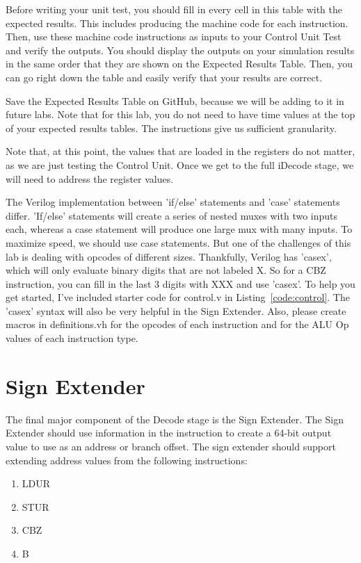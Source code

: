 Before writing your unit test, you should fill in every cell in this table with the expected results.  This includes producing the machine code for each instruction.  Then, use these machine code instructions as inputs to your Control Unit Test and verify the outputs.  You should display the outputs on your simulation results in the same order that they are shown on the Expected Results Table.  Then, you can go right down the table and easily verify that your results are correct.  

Save the Expected Results Table on GitHub, because we will be adding to it in future labs.  Note that for this lab, you do not need to have time values at the top of your expected results tables.  The instructions give us sufficient granularity.

Note that, at this point, the values that are loaded in the registers do not matter, as we are just testing the Control Unit.  Once we get to the full iDecode stage, we will need to address the register values.

The Verilog implementation between 'if/else' statements and 'case' statements differ.  'If/else' statements will create a series of nested muxes with two inputs each, whereas a case statement will produce one large mux with many inputs.  To maximize speed, we should use case statements.  But one of the challenges of this lab is dealing with opcodes of different sizes.  Thankfully, Verilog has 'casex', which will only evaluate binary digits that are not labeled X.  So for a CBZ instruction, you can fill in the last 3 digits with XXX and use 'casex'.  To help you get started, I've included starter code for control.v in  Listing~\ref{code:control}.  The 'casex' syntax will also be very helpful in the Sign Extender.  Also, please create macros in definitions.vh for the opcodes of each instruction and for the ALU Op values of each instruction type.


\section{Sign Extender}
The final major component of the Decode stage is the Sign Extender.  The Sign Extender should use information in the instruction to create a 64-bit output value to use as an address or branch offset.  The sign extender should support extending address values from the following instructions:
\begin{enumerate}
	\item LDUR
	\item STUR
	\item CBZ
	\item B
\end{enumerate}

